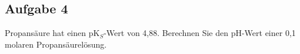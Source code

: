 \documentclass[a4paper,11pt]{article}
\newif\ifshowme
\begin{document}
\ifshowme
\antwort{
\footnotesize
\begin{align*}
K_S &= \frac{[H_3O^+] \cdot [A^-]}{[HA]}  \\
pK_S &= -\log K_S \\
pH &= -\log [H_3O^+]
\end{align*}
Henderson-Hasselbalch:
\begin{align*}
pK_S &= pH -\log(\frac{[A^-]}{HA}) \\
 &= -\log [H_3O^+] -\log(\frac{[A^-]}{HA})
\end{align*}
Umstellen:
\begin{align*}
pH - pK_S &= \log(\frac{[A^-]}{HA}) & | 10^x \\
10^{pH - pK_S} &= \frac{[A^-]}{HA} \\
	&~\hat{=}~ \frac{1 - [HA]}{HA} \\
	&~\hat{=}~ \frac{1}{HA} - \frac{[HA]}{HA} \\
	&~\hat{=}~ \frac{1}{HA} - 1 \\
\\
10^{pH - pK_S}	&~\hat{=}~ \frac{1}{HA} - 1 \\
10^{pH - pK_S} +1 &= \frac{1}{HA} \\ \\
HA &= \frac{1}{10^{pH - pK_S} + 1 }
\end{align*}
\pp
Nachdem Einsetzen von pK$_S$ und pH-Wert erhält man folgende Ergebnisse: \pp
pH 1 \RA 99,985\% \par pH 2 \RA 99,85\% \par pH 3 \RA 98,5\% \par pH 4 \RA 86,9\% \par pH 5 \RA 39,8\% \par pH 6 \RA 6,2\% \par pH 7 \RA 0,656\%
}
\pagebreak
\else
\fi


\subsection*{Aufgabe 4}
Propansäure hat einen pK$_S$-Wert von 4,88. Berechnen Sie den pH-Wert einer 0,1 molaren
Propansäurelösung.

\ifshowme
\antwort{
Formel für schwache Säuren:
\begin{align*}
pH &= \frac{1}{2} \cdot (pK_S - \log(c)) \\
pH &= \frac{1}{2} \cdot (4,88 - \log(0,1)) = 2,9
\end{align*}


}
\else
\fi
\end{document}
